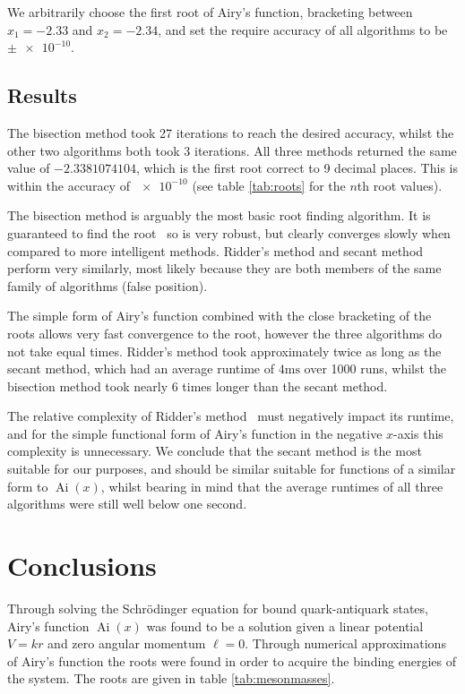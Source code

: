 \documentclass[]{article}
\newcommand{\Ai}[1]{\ensuremath{\operatorname{Ai}({#1})}}
\begin{document}
We arbitrarily choose the first root of Airy's function, bracketing between $x_{1} = -2.33$ and $x_{2} = -2.34$, and set the require accuracy of all algorithms to be $\pm\num{e-10}$.

\subsection{Results}\label{ssec:results}

The bisection method took 27 iterations to reach the desired accuracy, whilst the other two algorithms both took 3 iterations. All three methods returned the same value of  $-2.3381074104$, which is the first root correct to 9 decimal places. This is within the accuracy of $\num{e-10}$ (see table \ref{tab:roots} for the $n$th root values).

The bisection method is arguably the most basic root finding algorithm. It is guaranteed to find the root~\cite{ref:nr} so is very robust, but clearly converges slowly when compared to more intelligent methods. Ridder's method and secant method perform very similarly, most likely because they are both members of the same family of algorithms (false position).

The simple form of Airy's function combined with the close bracketing of the roots allows very fast convergence to the root, however the three algorithms do not take equal times. Ridder's method took approximately twice as long as the secant method, which had an average runtime of $4\si{\milli\second}$ over 1000 runs, whilst the bisection method took nearly 6 times longer than the secant method.

The relative complexity of Ridder's method~\cite{ref:nr} must negatively impact its runtime, and for the simple functional form of Airy's function in the negative $x$-axis this complexity is unnecessary. We conclude that the secant method is the most suitable for our purposes, and should be similar suitable for functions of a similar form to \Ai{x}, whilst bearing in mind that the average runtimes of all three algorithms were still well below one second.

\section{Conclusions}\label{sec:conclusion}

Through solving the Schr\"{o}dinger equation for bound quark-antiquark states, Airy's function \Ai{x} was found to be a solution given a linear potential $V = kr$ and zero angular momentum $\ell = 0$. Through numerical approximations of Airy's function the roots were found in order to acquire the binding energies of the \qqbar system. The roots are given in table \ref{tab:mesonmasses}.
\end{document}

